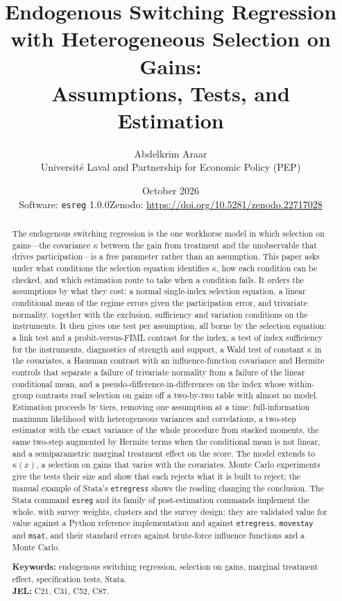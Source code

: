 \documentclass[11pt,a4paper]{article}
\title{\bf Endogenous Switching Regression with Heterogeneous Selection on Gains:\\
Assumptions, Tests, and Estimation}
\author{Abdelkrim Araar\\
\small Universit\'e Laval and Partnership for Economic Policy (PEP)}
\date{October 2026\\
\small Software: \texttt{esreg} 1.0.0\quad Zenodo: \url{https://doi.org/10.5281/zenodo.22717028}}
\theoremstyle{plain}
\theoremstyle{definition}
\theoremstyle{remark}
\newcommand{\1}{\mathbf{1}}
\newcommand{\cmd}[1]{\texttt{#1}}
\begin{document}
\maketitle

\begin{abstract}
\noindent
The endogenous switching regression is the one workhorse model in which
selection on gains---the covariance $\kappa$ between the gain from
treatment and the unobservable that drives participation---is a free
parameter rather than an assumption. This paper asks under what
conditions the selection equation identifies $\kappa$, how each
condition can be checked, and which estimation route to take when a
condition fails. It orders the assumptions by what they cost: a normal
single-index selection equation, a linear conditional mean of the regime
errors given the participation error, and trivariate normality, together
with the exclusion, sufficiency and variation conditions on the
instruments. It then gives one test per assumption, all borne by the
selection equation: a link test and a probit-versus-FIML contrast for the
index, a test of index sufficiency for the instruments, diagnostics of
strength and support, a Wald test of constant $\kappa$ in the covariates,
a Hausman contrast with an influence-function covariance and Hermite
controls that separate a failure of trivariate normality from a failure
of the linear conditional mean, and a pseudo-difference-in-differences
on the index whose within-group contrasts read selection on gains off a
two-by-two table with almost no model. Estimation proceeds by tiers,
removing one assumption at a time: full-information maximum likelihood
with heterogeneous variances and correlations, a two-step estimator
with the exact variance of the whole procedure from stacked moments, the
same two-step augmented by Hermite terms when the conditional mean is
not linear, and a semiparametric marginal treatment effect on the score. The model
extends to $\kappa(x)$, a selection on gains that varies with the
covariates. Monte Carlo experiments give the tests their size and show
that each rejects what it is built to reject; the manual example of
Stata's \cmd{etregress} shows the reading changing the conclusion. The
Stata command \cmd{esreg} and its family of post-estimation commands
implement the whole, with survey weights, clusters and the survey
design; they are validated value for value against a Python reference
implementation and against \cmd{etregress}, \cmd{movestay} and \cmd{msat},
and their standard errors against brute-force influence functions and a
Monte Carlo.

\medskip\noindent
\textbf{Keywords:} endogenous switching regression, selection on gains,
marginal treatment effect, specification tests, Stata.\\
\textbf{JEL:} C21, C31, C52, C87.
\end{abstract}
\end{document}
